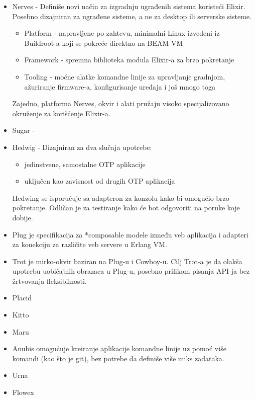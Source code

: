 \documentclass[a4paper]{article}
\begin{document}
\begin{itemize}
    \item Nerves - Definiše novi način za izgradnju ugrađenih sistema koristeći Elixir. Posebno dizajniran za ugrađene sisteme, a ne za desktop ili serverske sisteme. 
    \begin{itemize}
        \item Platform - napravljene po zahtevu, minimalni Linux izvedeni iz Buildroot-a koji se pokreće direktno na BEAM VM
        \item Framework - spremna biblioteka modula Elixir-a za brzo pokretanje
        \item Tooling - moćne alatke komandne linije za upravljanje gradnjom, ažuriranje firmware-a, konfigurisanje uređaja i još mnogo toga
    \end{itemize}
    Zajedno, platforma Nerves, okvir i alati pružaju visoko specijalizovano okruženje za korišćenje Elixir-a.
    \item Sugar - 
    \item Hedwig - Dizajniran za dva slučaja upotrebe: 
    \begin{itemize}
        \item jedinstvene, samostalne OTP aplikacije
        \item uključen kao zavisnost od drugih OTP aplikacija
    \end{itemize}
    Hedwing se isporučuje sa adapteron za konzolu kako bi omogućio brzo pokretanje. Odličan je za testiranje kako će bot odgovoriti na poruke koje dobije.
    \item Plug je specifikacija za *composable modele između veb aplikacija i adapteri za konekciju za različite veb servere u Erlang VM.
    \item Trot je mirko-okvir baziran na Plug-u i Cowboy-u. Cilj Trot-a je da olakša upotrebu uobičajnih obrazaca u Plug-u, posebno prilikom pisanja API-ja bez žrtvovanja fleksibilnosti.
    \item Placid
    \item Kitto
    \item Maru
    \item Anubis omogućuje kreiranje aplikacije komandne linije uz pomoć više komandi (kao što je git), bez potrebe da definiše više miks zadataka. 
    \item Urna
    \item Flowex
\end{itemize}
\end{document}
